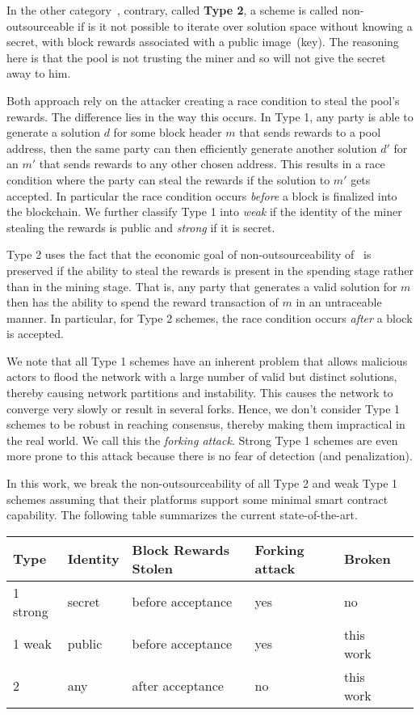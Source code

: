 \documentclass[11pt]{article}
\begin{document}
In the other category~\cite{autolykos, daian2017short, twophase}, contrary, called \textbf{Type 2}, a scheme is called
non-outsourceable if is it not possible to iterate over solution space without knowing a secret, with block rewards
associated with a public image~(key). The reasoning here is that the pool is not trusting the miner and so will not give
the secret away to him.  

Both approach rely on the attacker creating a race condition to steal the pool's rewards. The difference lies in the way this occurs. In Type 1, any party is able to generate a solution $d$ for some block header $m$ that sends rewards to a pool address, then the same party can then efficiently generate another solution $d'$ for an $m'$ that sends rewards to any other chosen address. This results in a race condition where the party can steal the rewards if the solution to $m'$ gets accepted. In particular the race condition occurs {\em before} a block is finalized into the blockchain. We further classify Type 1 into {\em weak} if the identity of the miner stealing the rewards is public and {\em strong} if it is secret. 

Type 2 uses the fact that the economic goal of non-outsourceability of~\cite{miller2015nonoutsourceable} is preserved if the ability to steal the rewards is present in the spending stage rather than in the mining stage. That is, any party that generates a valid solution for $m$ then has the ability to spend the reward transaction of $m$ in an untraceable manner. 
In particular, for Type 2 schemes, the race condition occurs {\em after} a block is accepted. 

We note that all Type 1 schemes have an inherent problem that allows malicious actors to flood the network with a large number of valid but distinct solutions, thereby causing network partitions and instability. This causes the network to converge very slowly or result in several forks. Hence, we don't consider Type 1 schemes to be robust in reaching consensus, thereby making them impractical in the real world. We call this the {\em forking attack}. Strong Type 1 schemes are even more prone to this attack because there is no fear of detection (and penalization). 

In this work, we break the non-outsourceability of all Type 2 and weak Type 1 schemes assuming that their platforms support
some minimal smart contract capability. The following table summarizes the current state-of-the-art. 


	\begin{tabular}{llllll}
		  Type     & Identity   & Block Rewards Stolen       & Forking attack & Broken \\\hline
		  1 strong & secret           & before acceptance  & yes            & no\\
		  1 weak   & public           & before acceptance  & yes            & this work\\
		  2        & any              & after acceptance   & no             & this work
	\end{tabular}
\end{document}
